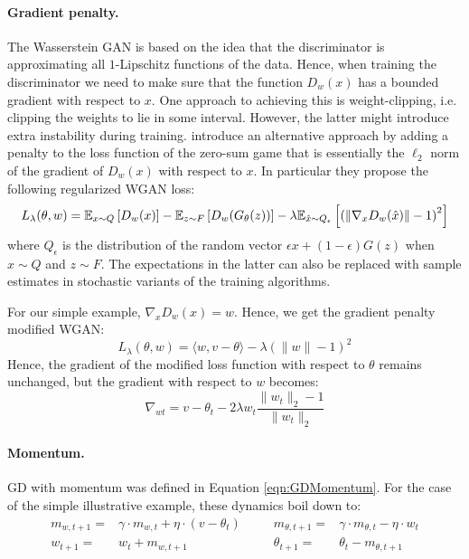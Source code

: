 \paragraph{Gradient penalty.} The Wasserstein GAN is based on the idea that the discriminator is approximating all $1$-Lipschitz functions of the data. Hence, when training the discriminator we need to make sure that the function $D_{w}(x)$ has a bounded gradient with respect to $x$. One approach to achieving this is weight-clipping, i.e. clipping the weights to lie in some interval. However, the latter might introduce extra instability during training. \cite{Gulrajani2017} introduce an alternative approach by adding a penalty to the loss function of the zero-sum game that is essentially the $\ell_2$ norm of the gradient of $D_{w}(x)$ with respect to $x$. In particular they propose the following regularized WGAN loss:
\begin{equation*}
L_{\lambda}(\theta, w) = \mathbb{E}_{x\sim Q}\left[ D_w(x) \right] - \mathbb{E}_{z\sim F}\left[D_w(G_\theta(z))\right] - \lambda \mathbb{E}_{\hat{x} \sim Q_{\epsilon}}\left[\left(\|\nabla_{x} D_w(\hat{x})\|-1\right)^2\right]
\end{equation*}
where $Q_{\epsilon}$ is the distribution of the random vector $\epsilon x + (1-\epsilon) G(z)$ when $x\sim Q$ and $z\sim F$. The expectations in the latter can also be replaced with sample estimates in stochastic variants of the training algorithms.

For our simple example, $\nabla_{x} D_w(x) = w$. Hence, we get the gradient penalty modified WGAN:
\begin{equation}
L_{\lambda}(\theta, w) = \langle w, v-\theta \rangle - \lambda \left(\|w\|-1\right)^2
\end{equation}
Hence, the gradient of the modified loss function with respect to $\theta$ remains unchanged, but the gradient with respect to $w$ becomes:
\begin{equation}
\nabla_{wt} = v-\theta_t - 2\lambda w_{t} \frac{\|w_t\|_2 -1}{\|w_t\|_2}
\end{equation}

\paragraph{Momentum.} GD with momentum was defined in Equation \eqref{eqn:GDMomentum}. For the case of the simple illustrative example, these dynamics boil down to:
\begin{equation}
\begin{aligned}
m_{w, t+1} =& \gamma \cdot m_{w, t} + \eta\cdot (v-\theta_{t})
~~~~&~~~~
m_{\theta, t+1} =& \gamma\cdot m_{\theta, t} - \eta\cdot  w_t\\
w_{t+1} =& w_{t} + m_{w, t+1}
~~~~&~~~~
\theta_{t+1} =& \theta_{t} - m_{\theta, t+1} 
\end{aligned}
\end{equation}

